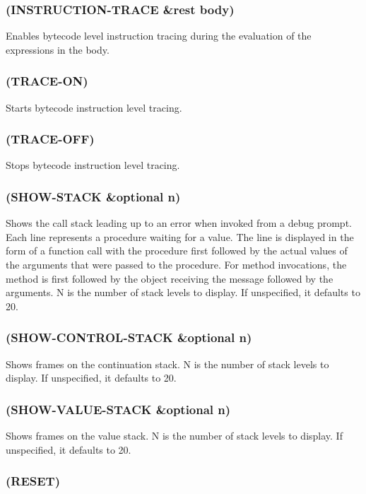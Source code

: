 \documentclass[11pt]{article}
\begin{document}
\subsubsection{(INSTRUCTION-TRACE \&rest body)}
\label{sec-4-44-2}

Enables bytecode level instruction tracing during the evaluation of
the expressions in the body.
\subsubsection{(TRACE-ON)}
\label{sec-4-44-3}

Starts bytecode instruction level tracing.
\subsubsection{(TRACE-OFF)}
\label{sec-4-44-4}

Stops bytecode instruction level tracing.
\subsubsection{(SHOW-STACK \&optional n)}
\label{sec-4-44-5}

Shows the call stack leading up to an error when invoked from a debug
prompt.  Each line represents a procedure waiting for a value.  The
line is displayed in the form of a function call with the procedure
first followed by the actual values of the arguments that were passed
to the procedure.  For method invocations, the method is first
followed by the object receiving the message followed by the
arguments.  N is the number of stack levels to display.  If
unspecified, it defaults to 20.
\subsubsection{(SHOW-CONTROL-STACK \&optional n)}
\label{sec-4-44-6}

Shows frames on the continuation stack.  N is the number of stack
levels to display.  If unspecified, it defaults to 20.
\subsubsection{(SHOW-VALUE-STACK \&optional n)}
\label{sec-4-44-7}

Shows frames on the value stack.  N is the number of stack levels to
display.  If unspecified, it defaults to 20.
\subsubsection{(RESET)}
\label{sec-4-44-8}
\end{document}
